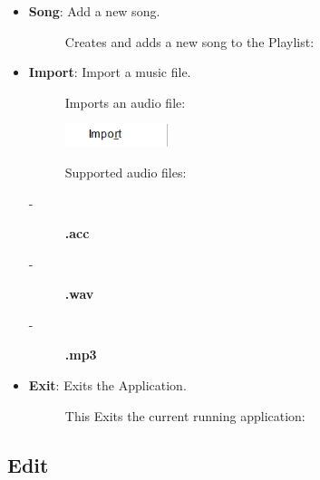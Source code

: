 \documentclass{article}
\begin{document}
\begin{itemize}
\begin{description}
    \end{description}
        \item \textbf{Song}: Add a new song.
    \begin{description}
        \item[] Creates and adds a new song to the Playlist:
    \end{description}
    \item \textbf{Import}: Import a music file.
    \begin{description}
        \item[] Imports an audio file:
        \item[] \includegraphics[width=3cm]{Images/File Import.png}
        \item[]Supported audio files: 
        \item[-]\textbf{.acc}
        \item[-]\textbf{.wav}
        \item[-]\textbf{.mp3}
    \end{description}
        \item \textbf{Exit}: Exits the Application.
    \begin{description}
        \item[] This Exits the current running application:
    \end{description}
\end{itemize}

\subsection{Edit}
\end{document}
